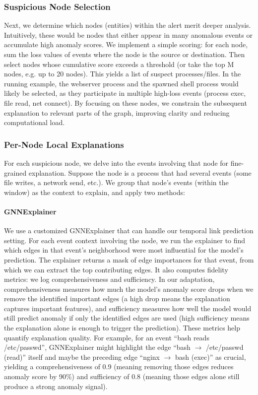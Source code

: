 \documentclass[conference]{IEEEtran}
\begin{document}
\subsubsection{Suspicious Node Selection}
Next, we determine which nodes (entities) within the alert merit deeper analysis. Intuitively, these would be nodes that either appear in many anomalous events or accumulate high anomaly scores. We implement a simple scoring: for each node, sum the loss values of events where the node is the source or destination. Then select nodes whose cumulative score exceeds a threshold (or take the top M nodes, e.g. up to 20 nodes). This yields a list of suspect processes/files. In the running example, the webserver process and the spawned shell process would likely be selected, as they participate in multiple high-loss events (process exec, file read, net connect). By focusing on these nodes, we constrain the subsequent explanation to relevant parts of the graph, improving clarity and reducing computational load.

\subsubsection{Per-Node Local Explanations}
For each suspicious node, we delve into the events involving that node for fine-grained explanation. Suppose the node is a process that had several events (some file writes, a network send, etc.). We group that node's events (within the window) as the context to explain, and apply two methods:

\paragraph{GNNExplainer}
We use a customized GNNExplainer that can handle our temporal link prediction setting. For each event context involving the node, we run the explainer to find which edges in that event's neighborhood were most influential for the model's prediction. The explainer returns a mask of edge importances for that event, from which we can extract the top contributing edges. It also computes fidelity metrics: we log comprehensiveness and sufficiency. In our adaptation, comprehensiveness measures how much the model's anomaly score drops when we remove the identified important edges (a high drop means the explanation captures important features), and sufficiency measures how well the model would still predict anomaly if only the identified edges are used (high sufficiency means the explanation alone is enough to trigger the prediction). These metrics help quantify explanation quality. For example, for an event ``bash reads /etc/passwd'', GNNExplainer might highlight the edge ``bash $\rightarrow$ /etc/passwd (read)'' itself and maybe the preceding edge ``nginx $\rightarrow$ bash (exec)'' as crucial, yielding a comprehensiveness of 0.9 (meaning removing those edges reduces anomaly score by 90\%) and sufficiency of 0.8 (meaning those edges alone still produce a strong anomaly signal).
\end{document}

